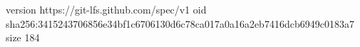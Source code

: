 version https://git-lfs.github.com/spec/v1
oid sha256:3415243706856e34bf1c6706130d6c78ca017a0a16a2eb7416dcb6949c0183a7
size 184
